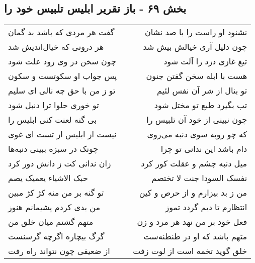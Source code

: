 \begin{center}
\section*{بخش ۶۹ - باز تقریر ابلیس تلبیس خود را}
\label{sec:sh069}
\begin{longtable}{l p{0.5cm} r}
گفت هر مردی که باشد بد گمان
&&
نشنود او راست را با صد نشان
\\
هر درونی که خیال‌اندیش شد
&&
چون دلیل آری خیالش بیش شد
\\
چون سخن در وی رود علت شود
&&
تیغ غازی دزد را آلت شود
\\
پس جواب او سکوتست و سکون
&&
هست با ابله سخن گفتن جنون
\\
تو ز من با حق چه نالی ای سلیم
&&
تو بنال از شر آن نفس لئیم
\\
تو خوری حلوا ترا دنبل شود
&&
تب بگیرد طبع تو مختل شود
\\
بی گنه لعنت کنی ابلیس را
&&
چون نبینی از خود آن تلبیس را
\\
نیست از ابلیس از تست ای غوی
&&
که چو روبه سوی دنبه می‌روی
\\
چونک در سبزه ببینی دنبه‌ها
&&
دام باشد این ندانی تو چرا
\\
زان ندانی کت ز دانش دور کرد
&&
میل دنبه چشم و عقلت کور کرد
\\
حبک الاشیاء یعمیک یصم
&&
نفسک السودا جنت لا تختصم
\\
تو گنه بر من منه کژ کژ مبین
&&
من ز بد بیزارم و از حرص و کین
\\
من بدی کردم پشیمانم هنوز
&&
انتظارم تا دیم گردد تموز
\\
متهم گشتم میان خلق من
&&
فعل خود بر من نهد هر مرد و زن
\\
گرگ بیچاره اگرچه گرسنست
&&
متهم باشد که او در طنطنه‌ست
\\
از ضعیفی چون نتواند راه رفت
&&
خلق گوید تخمه است از لوت زفت
\\
\end{longtable}
\end{center}
